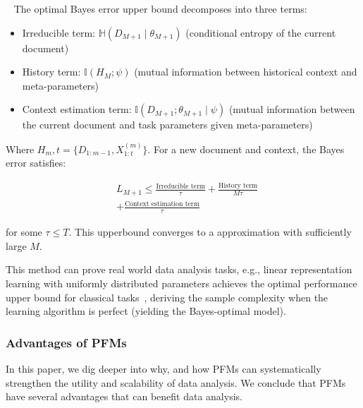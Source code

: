     \begin{lemma}~\cite{JeonLLR24}
    The optimal Bayes error upper bound decomposes into three terms: 
    
    \begin{itemize}
        \item Irreducible term: \( \mathbb{H}(D_{M+1} \mid \theta_{M+1}) \) (conditional entropy of the current document)
        \item History term: \( \mathbb{I}(H_M; \psi) \) (mutual information between historical context and meta-parameters)
        \item Context estimation term: \( \mathbb{I}(D_{M+1}; \theta_{M+1} \mid \psi) \) (mutual information between the current document and task parameters given meta-parameters)
    \end{itemize}
    
    Where \( H_m,t = \{ D_{1:m-1}, X_{1:t}^{(m)} \} \). For a new document and context, the Bayes error satisfies:

    \begin{equation}
        \begin{aligned}
            & L_{M+1} \leq \frac{\text{Irreducible term}}{\tau} + \frac{\text{History term}}{M\tau} \\
            & + \frac{\text{Context estimation term}}{\tau}
        \end{aligned}
    \end{equation}
    
    for some \( \tau \leq T \). This upperbound converges to a approximation with sufficiently large \( M \).
    \end{lemma}
    
    This method can prove real world data analysis tasks, e.g., linear representation learning with uniformly distributed parameters achieves the optimal performance upper bound for classical tasks~\cite{JeonLLR24}, deriving the sample complexity when the learning algorithm is perfect (yielding the Bayes-optimal model).

  

  \subsubsection{Advantages of PFMs}

  In this paper, we dig deeper into why, and how PFMs can systematically strengthen the utility and scalability of data analysis. We conclude that PFMs have several advantages that can benefit data analysis. 
  
